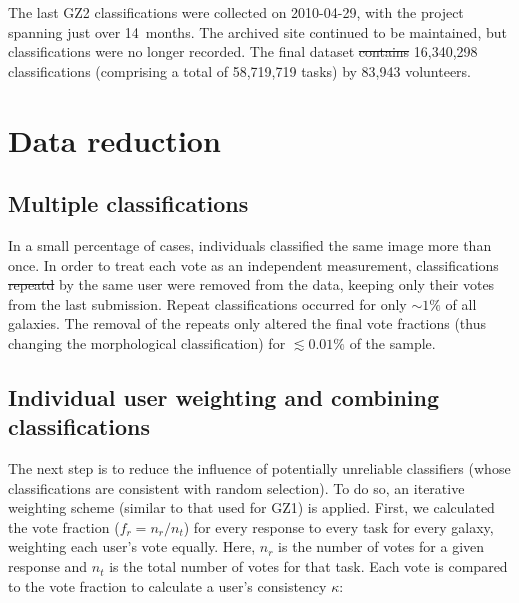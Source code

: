 \documentclass[useAMS,usenatbib]{mn2e}
\providecommand{\DIFaddtex}[1]{{\protect\color{blue}\uwave{#1}}} %
\providecommand{\DIFdeltex}[1]{{\protect\color{red}\sout{#1}}}                      %
\providecommand{\DIFaddbegin}{} %
\providecommand{\DIFaddend}{} %
\providecommand{\DIFdelbegin}{} %
\providecommand{\DIFdelend}{} %
\providecommand{\DIFadd}[1]{\texorpdfstring{\DIFaddtex{#1}}{#1}} %
\providecommand{\DIFdel}[1]{\texorpdfstring{\DIFdeltex{#1}}{}} %
\begin{document}
The last GZ2 classifications were collected on 2010-04-29, with the project spanning just over 14~months. The archived site continued to be maintained, but classifications were no longer recorded. The final dataset \DIFdelbegin \DIFdel{contains }\DIFdelend \DIFaddbegin \DIFadd{contained }\DIFaddend 16,340,298 classifications (comprising a total of 58,719,719 tasks) by 83,943 volunteers.


\section{Data reduction} \label{sec-datareduction}

\subsection{Multiple classifications}
In a small percentage of cases, individuals classified the same image more than once. In order to treat each vote as an independent measurement, classifications \DIFdelbegin \DIFdel{repeatd }\DIFdelend \DIFaddbegin \DIFadd{repeated }\DIFaddend by the same user were removed from the data, keeping only their votes from the last submission. Repeat classifications occurred for only $\sim1\%$ of all galaxies. The removal of the repeats only altered the final vote fractions (thus changing the morphological classification) for $\lesssim0.01\%$ of the sample.  

\subsection{Individual user weighting and combining classifications}\label{ssec-consistency}

The next step is to reduce the influence of potentially unreliable classifiers (whose classifications are consistent with random selection). To do so, an iterative weighting scheme (similar to that used for GZ1) is applied. First, we calculated the vote fraction (\DIFdelbegin \DIFdel{$f_r = n_{r}/n_{t}$}\DIFdelend \DIFaddbegin \DIFadd{$f_\mathrm{r} = N_\mathrm{r}/N_\mathrm{t}$}\DIFaddend ) for every response to every task for every galaxy, weighting each user's vote equally. Here, \DIFdelbegin \DIFdel{$n_r$ }\DIFdelend \DIFaddbegin \DIFadd{$N_\mathrm{r}$ }\DIFaddend is the number of votes for a given response and \DIFdelbegin \DIFdel{$n_{t}$ }\DIFdelend \DIFaddbegin \DIFadd{$N_\mathrm{t}$ }\DIFaddend is the total number of votes for that task. Each vote is compared to the vote fraction to calculate a user's consistency $\kappa$:
\DIFdelbegin %
\end{document}
